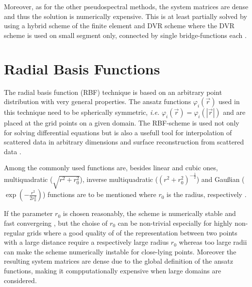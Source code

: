 {Moreover, as for the other pseudospectral methods, the system matrices are dense and thus the solution is numerically expensive.
This is at least partially solved by using a hybrid scheme of the finite element and DVR scheme where the DVR scheme is used on small segment only, connected by single bridge-functions each \cite{taoDVR,impLDVR}.

\section{Radial Basis Functions}
The radial basis function (RBF) technique is based on an arbitrary point distribution with very general properties.
The ansatz functions $\varphi_i(\vec{r})$ used in this technique need to be spherically symmetric, \textit{i.e.} $\varphi_i(\vec{r})=\varphi_i(|\vec{r}|)$ and are placed at the grid points on a given domain.
The RBF-scheme is used not only for solving differential equations but is also a usefull tool for interpolation of scattered data in arbitrary dimensions \cite{rbfInterpol} and surface reconstruction from scattered data \cite{rbfSurf}.

Among the commonly used functions are, besides linear and cubic ones, multiquadratic ($\sqrt { r^2 + r_0^2 }$), inverse multiquadratic ($( r^2 + r_0^2)^{-\frac 12}$) and Gau\ss ian ($ \exp(-\frac{r^2}{2r_0^2})$) functions are to be mentioned where $r_0$ is the radius, respectively \cite{rbfSE,rbfWave}.

If the parameter $r_0$ is chosen reasonably, the scheme is numerically stable and fast convergeing \cite{rbfSE}, but the choise of $r_0$ can be non-trivial especially for highly non-regular grids where a good quality of of the representation between two points with a large distance require a respectively large radius $r_0$ whereas too large radii can make the scheme numerically instable for close-lying points.
Moreover the resulting system matrices are dense due to the global definition of the ansatz functions, making it compputationally expensive when large domains are considered.

}
